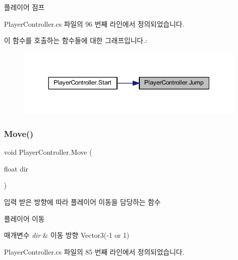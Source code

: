 플레이어 점프 



Player\+Controller.\+cs 파일의 96 번째 라인에서 정의되었습니다.


\begin{DoxyCode}{0}

\end{DoxyCode}
이 함수를 호출하는 함수들에 대한 그래프입니다.\+:
\nopagebreak
\begin{figure}[H]
\begin{center}
\leavevmode
\includegraphics[width=338pt]{dc/dde/class_player_controller_a8a7010cb6f3c524737be3f6f77553df9_icgraph}
\end{center}
\end{figure}
\mbox{\label{class_player_controller_a6e383e6fbce014f4a841143774a6a1e7}} 
\subsubsection{\texorpdfstring{Move()}{Move()}}
{\footnotesize\ttfamily void Player\+Controller.\+Move (\begin{DoxyParamCaption}\item[{float}]{dir }\end{DoxyParamCaption})\hspace{0.3cm}{\ttfamily [inline]}}



입력 받은 방향에 따라 플레이어 이동을 담당하는 함수 

플레이어 이동 
\begin{DoxyParams}{매개변수}
{\em dir} & 이동 방향 Vector3(-\/1 or 1) \\
\hline
\end{DoxyParams}


Player\+Controller.\+cs 파일의 85 번째 라인에서 정의되었습니다.


